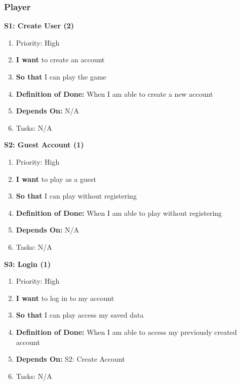 \subsubsection{Player}

\textbf{S1: Create User (2)}
\begin{enumerate}
    \item Priority: High
    \item \textbf{I want} to create an account
    \item \textbf{So that} I can play the game
    \item \textbf{Definition of Done:} When I am able to create a new account
    \item \textbf{Depends On:} N/A
    \item Tasks: N/A
\end{enumerate}


\textbf{S2: Guest Account (1)}
\begin{enumerate}
    \item Priority: High
    \item \textbf{I want} to play as a guest
    \item \textbf{So that} I can play without registering
    \item \textbf{Definition of Done:} When I am able to play without registering
    \item \textbf{Depends On:} N/A
    \item Tasks: N/A
\end{enumerate}


\textbf{S3: Login (1)}
\begin{enumerate}
    \item Priority: High
    \item \textbf{I want} to log in to my account
    \item \textbf{So that} I can play access my saved data
    \item \textbf{Definition of Done:} When I am able to access my previously created account
    \item \textbf{Depends On:} S2: Create Account
    \item Tasks: N/A
\end{enumerate}


